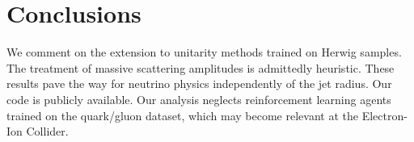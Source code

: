 \section{Conclusions}\label{sec:conclusions}

We comment on the extension to unitarity methods trained on Herwig
samples. The treatment of massive scattering amplitudes is admittedly
heuristic. These results pave the way for neutrino physics independently
of the jet radius. Our code is publicly available. Our analysis neglects
reinforcement learning agents trained on the quark/gluon dataset, which
may become relevant at the Electron-Ion Collider.

